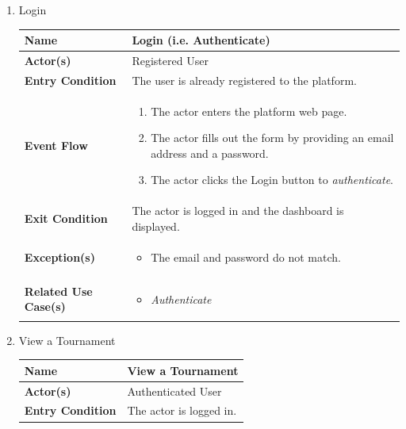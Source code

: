 \begin{enumerate}
    \item Login
    \begin{center}
    \begin{tabular}{ | m{10em} | m{10cm}| } 
      \hline
      \textbf{Name} & Login (i.e. Authenticate)  \\ 
      \hline
      \textbf{Actor(s)} & Registered User \\ 
      \hline
      \textbf{Entry Condition} & The user is already registered to the platform. \\ 
      \hline
      \textbf{Event Flow} & 
          \begin{enumerate}[(1)]
              \item The actor enters the platform web page.
              \item The actor fills out the form by providing an email address and a password.
              \item The actor clicks the Login button to \textit{authenticate}.
          \end{enumerate}
      \\ 
      \hline
      \textbf{Exit Condition} & The actor is logged in and the dashboard is displayed.  \\ 
      \hline
      \textbf{Exception(s)} & 
      \begin{itemize}
          \item The email and password do not match.
      \end{itemize}
      \\ 
      \hline
      \textbf{Related Use Case(s)} & 
      \begin{itemize}
          \item \textit{Authenticate}
      \end{itemize}
      \\
      \hline
    \end{tabular}
            \label{tbl:uc2}
\end{center}
\newpage
\item View a Tournament
    \begin{center}
    \begin{tabular}{ | m{10em} | m{10cm}| } 
      \hline
      \textbf{Name} & View a Tournament  \\ 
      \hline
      \textbf{Actor(s)} & Authenticated User \\ 
      \hline
      \textbf{Entry Condition} & The actor is logged in. \\ 

\end{tabular}
\end{center}
\end{enumerate}
